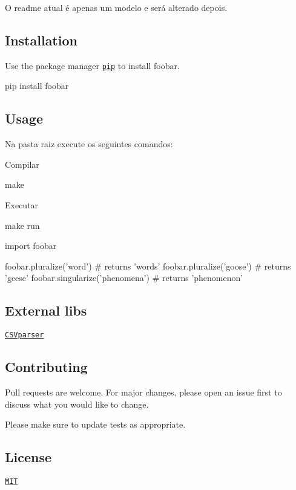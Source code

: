 O readme atual é apenas um modelo e será alterado depois.

\subsection*{Installation}

Use the package manager \href{https://pip.pypa.io/en/stable/}{\tt pip} to install foobar.


\begin{DoxyCode}
pip install foobar
\end{DoxyCode}


\subsection*{Usage}

Na pasta raiz execute os seguintes comandos\+:

Compilar 
\begin{DoxyCode}
make
\end{DoxyCode}
 Executar 
\begin{DoxyCode}
make run
\end{DoxyCode}



\begin{DoxyCode}
import foobar

foobar.pluralize('word') # returns 'words'
foobar.pluralize('goose') # returns 'geese'
foobar.singularize('phenomena') # returns 'phenomenon'
\end{DoxyCode}
 \subsection*{External libs}


\begin{DoxyItemize}
\item \href{https://github.com/rsylvian/CSVparser}{\tt C\+S\+Vparser}
\end{DoxyItemize}

\subsection*{Contributing}

Pull requests are welcome. For major changes, please open an issue first to discuss what you would like to change.

Please make sure to update tests as appropriate.

\subsection*{License}

\href{https://choosealicense.com/licenses/mit/}{\tt M\+IT} 